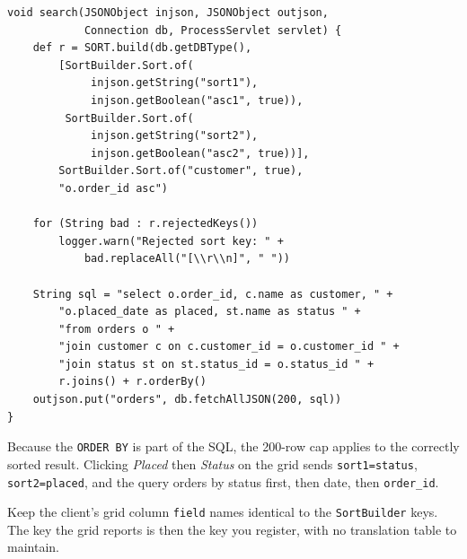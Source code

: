 \begin{lstlisting}[style=groovy]
void search(JSONObject injson, JSONObject outjson,
            Connection db, ProcessServlet servlet) {
    def r = SORT.build(db.getDBType(),
        [SortBuilder.Sort.of(
             injson.getString("sort1"),
             injson.getBoolean("asc1", true)),
         SortBuilder.Sort.of(
             injson.getString("sort2"),
             injson.getBoolean("asc2", true))],
        SortBuilder.Sort.of("customer", true),
        "o.order_id asc")

    for (String bad : r.rejectedKeys())
        logger.warn("Rejected sort key: " +
            bad.replaceAll("[\\r\\n]", " "))

    String sql = "select o.order_id, c.name as customer, " +
        "o.placed_date as placed, st.name as status " +
        "from orders o " +
        "join customer c on c.customer_id = o.customer_id " +
        "join status st on st.status_id = o.status_id " +
        r.joins() + r.orderBy()
    outjson.put("orders", db.fetchAllJSON(200, sql))
}
\end{lstlisting}

\noindent
Because the \texttt{ORDER BY} is part of the SQL, the 200-row cap applies to the correctly sorted result.  Clicking \emph{Placed} then \emph{Status} on the grid sends \texttt{sort1=status}, \texttt{sort2=placed}, and the query orders by status first, then date, then \texttt{order\_id}.

\begin{tipbox}
Keep the client's grid column \texttt{field} names identical to the \texttt{SortBuilder} keys.  The key the grid reports is then the key you register, with no translation table to maintain.
\end{tipbox}
